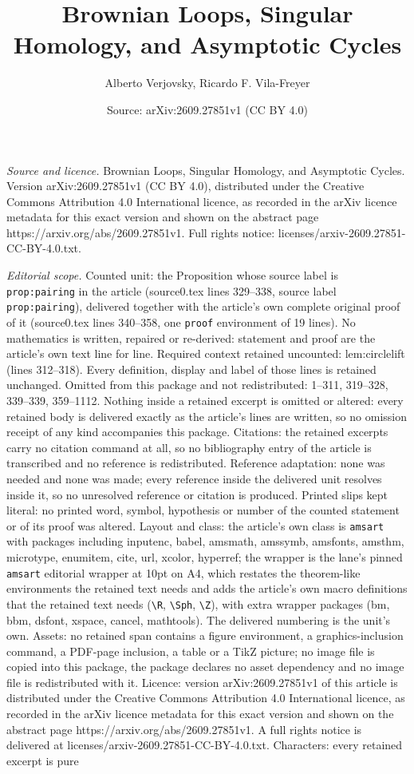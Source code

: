 \documentclass[10pt,a4paper]{amsart}
\title[Brownian Loops, Singular Homology, and Asymptotic Cycles]{Brownian Loops, Singular Homology, and Asymptotic Cycles}
\author{Alberto Verjovsky, Ricardo F. Vila-Freyer}
\date{Source: arXiv:2609.27851v1 (CC BY 4.0)}
\begin{document}
\maketitle

\noindent\emph{Source and licence.} Brownian Loops, Singular Homology, and Asymptotic Cycles. Version arXiv:2609.27851v1 (CC BY 4.0), distributed under the Creative Commons Attribution 4.0 International licence, as recorded in the arXiv licence metadata for this exact version and shown on the abstract page https://arxiv.org/abs/2609.27851v1. Full rights notice: licenses/arxiv-2609.27851-CC-BY-4.0.txt.\par\smallskip

\noindent\textit{Editorial scope.} Counted unit: the Proposition whose source label is \texttt{prop:pairing} in the article (source0.tex lines 329--338, source label \texttt{prop:pairing}), delivered together with the article's own complete original proof of it (source0.tex lines 340--358, one \texttt{proof} environment of 19 lines). No mathematics is written, repaired or re-derived: statement and proof are the article's own text line for line. Required context retained uncounted: lem:circlelift (lines 312--318). Every definition, display and label of those lines is retained unchanged. Omitted from this package and not redistributed: 1--311, 319--328, 339--339, 359--1112. Nothing inside a retained excerpt is omitted or altered: every retained body is delivered exactly as the article's lines are written, so no omission receipt of any kind accompanies this package. Citations: the retained excerpts carry no citation command at all, so no bibliography entry of the article is transcribed and no reference is redistributed. Reference adaptation: none was needed and none was made; every reference inside the delivered unit resolves inside it, so no unresolved reference or citation is produced. Printed slips kept literal: no printed word, symbol, hypothesis or number of the counted statement or of its proof was altered. Layout and class: the article's own class is \texttt{amsart} with packages including inputenc, babel, amsmath, amssymb, amsfonts, amsthm, microtype, enumitem, cite, url, xcolor, hyperref; the wrapper is the lane's pinned \texttt{amsart} editorial wrapper at 10pt on A4, which restates the theorem-like environments the retained text needs and adds the article's own macro definitions that the retained text needs (\texttt{\textbackslash R}, \texttt{\textbackslash Sph}, \texttt{\textbackslash Z}), with extra wrapper packages (bm, bbm, dsfont, xspace, cancel, mathtools). The delivered numbering is the unit's own. Assets: no retained span contains a figure environment, a graphics-inclusion command, a PDF-page inclusion, a table or a TikZ picture; no image file is copied into this package, the package declares no asset dependency and no image file is redistributed with it. Licence: version arXiv:2609.27851v1 of this article is distributed under the Creative Commons Attribution 4.0 International licence, as recorded in the arXiv licence metadata for this exact version and shown on the abstract page https://arxiv.org/abs/2609.27851v1. A full rights notice is delivered at licenses/arxiv-2609.27851-CC-BY-4.0.txt. Characters: every retained excerpt is pure 
\end{document}
